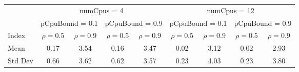 \begin{tabular}{lc|c|c|c|c|c|c|c}
\toprule
& \multicolumn{4}{c|}{numCpus = 4} & \multicolumn{4}{c}{numCpus = 12} \\
& \multicolumn{2}{c|}{pCpuBound = 0.1} & \multicolumn{2}{c|}{pCpuBound = 0.9} & \multicolumn{2}{c|}{pCpuBound = 0.1} & \multicolumn{2}{c}{pCpuBound = 0.9} \\
Index & $\rho = 0.5$ & $\rho = 0.9$ & $\rho = 0.5$ & $\rho = 0.9$ & $\rho = 0.5$ & $\rho = 0.9$ & $\rho = 0.5$ & $\rho = 0.9$ \\
\midrule
Mean & 0.17 & 3.54 & 0.16 & 3.47 & 0.02 & 3.12 & 0.02 & 2.93 \\
\midrule
Std Dev & 0.66 & 3.62 & 0.62 & 3.57 & 0.23 & 4.03 & 0.23 & 3.80 \\
\bottomrule
\end{tabular}